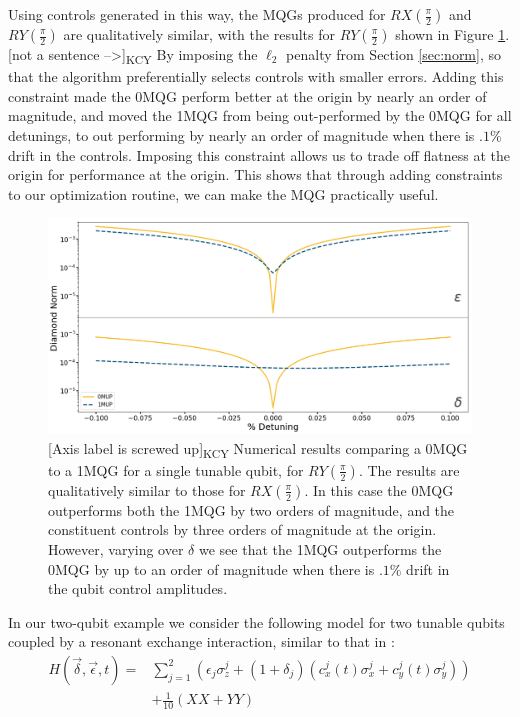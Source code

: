 \documentclass[aps,nofootinbib,pra,notitlepage,twocolumn]{revtex4-1}
\newcommand{\kcy}[1]{{\color{red}[#1]\textsubscript{\rm{KCY}}}}
\begin{document}
Using controls generated in this way, the MQGs produced for $RX(\frac{\pi}{2})$ and $RY(\frac{\pi}{2})$ are qualitatively similar, with the results for $RY(\frac{\pi}{2})$ shown in Figure \ref{fig:YMQG}. \kcy{not a sentence -->} By imposing the $\ell_2$ penalty from Section \ref{sec:norm}, so that the algorithm preferentially selects controls with smaller errors. Adding this constraint made the 0MQG perform better at the origin by nearly an order of magnitude, and moved the 1MQG from being out-performed by the 0MQG for all detunings, to out performing by nearly an order of magnitude when there is $.1\%$ drift in the controls. Imposing this constraint allows us to trade off flatness at the origin for performance at the origin. This shows that through adding constraints to our optimization routine, we can make the MQG practically useful. 

\begin{figure}
  \centering
  \includegraphics[width=\columnwidth]{SQRTY_no_member.png}
  \caption{\kcy{Axis label is screwed up} Numerical results comparing a 0MQG to a 1MQG for a single tunable qubit, for $RY(\frac{\pi}{2})$. The results are qualitatively similar to those for $RX(\frac{\pi}{2})$. In this case the 0MQG outperforms both the 1MQG by two orders of magnitude, and the constituent controls by three orders of magnitude at the origin. However, varying over $\delta$ we see that the 1MQG outperforms the 0MQG by up to an order of magnitude when there is $.1\%$ drift in the qubit control amplitudes.}
  \label{fig:YMQG}
\end{figure}

In our two-qubit example we consider the following model for two tunable qubits coupled by a resonant exchange interaction, similar to that in \cite{McKay2016}:
\begin{equation} \label{eq:2Qham}
\begin{split}
H(\vec{\delta}, \vec{\epsilon}, t) = &\sum_{j=1}^2(\epsilon_j\sigma_z^j + (1 + \delta_j)(c_x^j(t)\sigma_x^j + c_y^j(t)\sigma_y^j)) \\
&+ \frac{1}{10}(XX + YY)
\end{split}
\end{equation}
\end{document}
